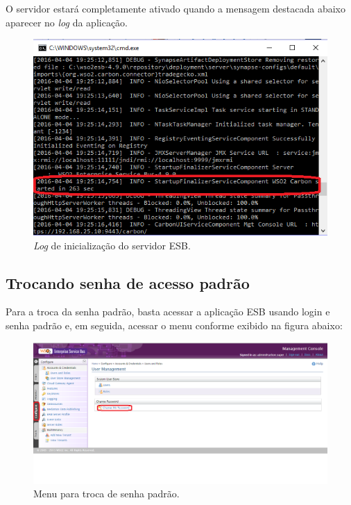 O servidor estará completamente ativado quando a mensagem destacada abaixo
aparecer no \textit{log} da aplicação.

\begin{figure}[htb]
\centering
\includegraphics[width=1.0\textwidth]{figuras/log_iniciacao_wso2.PNG}
\caption{\textit{Log} de inicialização do servidor ESB.}
\label{log_iniciacao_wso2}
\end{figure}

\subsection{Trocando senha de acesso padrão}

Para a troca da senha padrão, basta acessar a aplicação ESB usando login e senha
padrão e, em seguida, acessar o menu conforme exibido na figura abaixo:

\begin{figure}[htb]
\centering
\includegraphics[width=1.0\textwidth]{figuras/mudar_senha.PNG}
\caption{Menu para troca de senha padrão.}
\label{mudar_senha}
\end{figure}